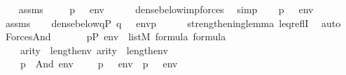 \begin{isabellebody}
\ \ \isamarkupfalse%
\ assms\isanewline
\ \ \isamarkupfalse%
\ \ {\isachardoublequoteopen}{\isacharparenleft}{\kern0pt}p\ {\isasymtturnstile}\ {\isasymphi}\ env{\isacharparenright}{\kern0pt}{\isachardoublequoteclose}\isanewline
\ \ \ \ \isamarkupfalse%
\ dense{\isacharunderscore}{\kern0pt}below{\isacharunderscore}{\kern0pt}imp{\isacharunderscore}{\kern0pt}forces\ \isamarkupfalse%
\ simp\isanewline
{}\isamarkupfalse%
\isanewline
\ \ \isamarkupfalse%
\ {\isachardoublequoteopen}p\ {\isasymtturnstile}\ {\isasymphi}\ env{\isachardoublequoteclose}\isanewline
\ \ \isamarkupfalse%
\ assms\isanewline
\ \ \isamarkupfalse%
\ {\isachardoublequoteopen}dense{\isacharunderscore}{\kern0pt}below{\isacharparenleft}{\kern0pt}{\isacharbraceleft}{\kern0pt}q{\isasymin}P{\isachardot}{\kern0pt}\ q\ {\isasymtturnstile}\ {\isasymphi}\ env{\isacharbraceright}{\kern0pt}{\isacharcomma}{\kern0pt}p{\isacharparenright}{\kern0pt}{\isachardoublequoteclose}\isanewline
\ \ \ \ \isamarkupfalse%
\ strengthening{\isacharunderscore}{\kern0pt}lemma\ leq{\isacharunderscore}{\kern0pt}reflI\ \isamarkupfalse%
\ auto\isanewline
{}\isamarkupfalse%
%
\endisatagproof
{\isafoldproof}%
%
\isadelimproof
%
\endisadelimproof
%
\isadelimdocument
%
\endisadelimdocument
%
\isatagdocument
%
\isamarkuptrue%
%
\endisatagdocument
{\isafolddocument}%
%
\isadelimdocument
%
\endisadelimdocument
{}\isamarkupfalse%
\ Forces{\isacharunderscore}{\kern0pt}And{\isacharcolon}{\kern0pt}\isanewline
\ \ \isanewline
\ \ \ \ {\isachardoublequoteopen}p{\isasymin}P{\isachardoublequoteclose}\ {\isachardoublequoteopen}env\ {\isasymin}\ list{\isacharparenleft}{\kern0pt}M{\isacharparenright}{\kern0pt}{\isachardoublequoteclose}\ {\isachardoublequoteopen}{\isasymphi}{\isasymin}formula{\isachardoublequoteclose}\ {\isachardoublequoteopen}{\isasympsi}{\isasymin}formula{\isachardoublequoteclose}\ \isanewline
\ \ \ \ {\isachardoublequoteopen}arity{\isacharparenleft}{\kern0pt}{\isasymphi}{\isacharparenright}{\kern0pt}\ {\isasymle}\ length{\isacharparenleft}{\kern0pt}env{\isacharparenright}{\kern0pt}{\isachardoublequoteclose}\ {\isachardoublequoteopen}arity{\isacharparenleft}{\kern0pt}{\isasympsi}{\isacharparenright}{\kern0pt}\ {\isasymle}\ length{\isacharparenleft}{\kern0pt}env{\isacharparenright}{\kern0pt}{\isachardoublequoteclose}\isanewline
\ \ \isanewline
\ \ \ \ {\isachardoublequoteopen}p\ {\isasymtturnstile}\ And{\isacharparenleft}{\kern0pt}{\isasymphi}{\isacharcomma}{\kern0pt}{\isasympsi}{\isacharparenright}{\kern0pt}\ env\ \ \ {\isasymlongleftrightarrow}\ \ {\isacharparenleft}{\kern0pt}p\ {\isasymtturnstile}\ {\isasymphi}\ env{\isacharparenright}{\kern0pt}\ {\isasymand}\ {\isacharparenleft}{\kern0pt}p\ {\isasymtturnstile}\ {\isasympsi}\ env{\isacharparenright}{\kern0pt}{\isachardoublequoteclose}\isanewline

\end{isabellebody}
